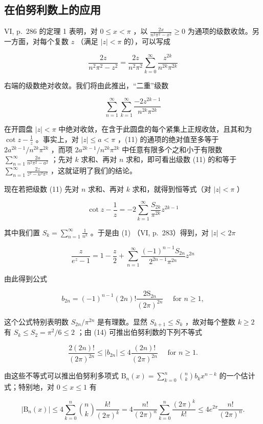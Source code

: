 \subsection{在伯努利数上的应用}

VI, p.~286 的定理 1 表明，对 \(0 \leqslant x < \pi\) ，以 \(\frac{2x}{n^2\pi^2 - x^2} \geqslant 0\) 为通项的级数收敛。另一方面，对每个复数 \(z\) （满足 \(|z| < \pi\) 的），可以写成

\[
{\frac {2 z}{n ^ {2} \pi^ {2} - z ^ {2}}} = {\frac {2 z}{n ^ {2} \pi^ {2}}} \sum_ {k = 0} ^ {\infty} {\frac {z ^ {2 k}}{n ^ {2 k} \pi^ {2 k}}}
\]

右端的级数绝对收敛。我们将由此推出，“二重”级数

\[
\sum_ {n = 1} ^ {\infty} \sum_ {k = 1} ^ {\infty} \frac {- 2 z ^ {2 k - 1}}{n ^ {2 k} \pi^ {2 k}}\tag{11}
\]

在开圆盘 \(|z| < \pi\) 中绝对收敛，在含于此圆盘的每个紧集上正规收敛，且其和为 \(\cot z - \frac{1}{z}\) 。事实上，对 \(|z| \leqslant a < \pi\) ，(11) 的通项的绝对值至多等于 \(2a^{2k-1}/n^{2k}\pi^{2k}\) ，而项 \(2a^{2k-1}/n^{2k}\pi^{2k}\) 中任意有限多个之和小于有限数 \(\sum_{n=1}^{\infty} \frac{2a}{n^2\pi^2 - a^2}\) ；先对 \(k\) 求和、再对 \(n\) 求和，即可看出级数 (11) 的和等于 \(\sum_{n=1}^{\infty} \frac{2z}{z^2 - n^2\pi^2}\) ，这就证明了我们的结论。

现在若把级数 (11) 先对 \(n\) 求和、再对 \(k\) 求和，就得到恒等式（对 \(|z| < \pi\) ）

\[
\cot z - \frac {1}{z} = - 2 \sum_ {k = 1} ^ {\infty} \frac {S _ {2 k}}{\pi^ {2 k}} z ^ {2 k - 1}\tag{12}
\]

其中我们置 \(S_{k} = \sum_{n=1}^{\infty} \frac{1}{n^{k}}\) 。于是由 (1) （VI, p.~283）得到，对 \(|z| < 2\pi\)

\[
\frac {z}{e ^ {z} - 1} = 1 - \frac {z}{2} + \sum_ {n = 1} ^ {\infty} \frac {(- 1) ^ {n - 1} S _ {2 n}}{2 ^ {2 n - 1} \pi^ {2 n}} z ^ {2 n}\tag{13}
\]

由此得到公式

\[
b _ {2 n} = (- 1) ^ {n - 1} (2 n)! \frac {2 \mathrm{S} _ {2 n}}{(2 \pi) ^ {2 n}} \quad \text {   for   } n \geqslant 1,\tag{14}
\]

这个公式特别表明数 \(S_{2n} / \pi^{2n}\) 是有理数。显然 \(S_{k + 1} \leqslant S_k\) ，故对每个整数 \(k \geqslant 2\) 有 \(S_k \leqslant S_2 = \pi^2 / 6 \leqslant 2\) ；由 (14) 可推出伯努利数的下列不等式

\[
\frac {2 (2 n) !}{(2 \pi) ^ {2 n}} \leqslant | b _ {2 n} | \leqslant 4 \frac {(2 n) !}{(2 \pi) ^ {2 n}} \quad \text {   for   } n \geqslant 1.\tag{15}
\]

由这些不等式可以推出伯努利多项式 \(\mathrm{B}_n(x) = \sum_{k=0}^{n}\binom{n}{k}b_kx^{n - k}\) 的一个估计式；特别地，对 \(0 \leqslant x \leqslant 1\) 有

\[
\left| \mathrm{B} _ {n} (x) \right| \leqslant 4 \sum_ {k = 0} ^ {n} \binom {n} {k} \frac {k !}{(2 \pi) ^ {k}} = 4 \frac {n !}{(2 \pi) ^ {n}} \sum_ {k = 0} ^ {n} \frac {(2 \pi) ^ {k}}{k !} \leqslant 4 e ^ {2 \pi} \frac {n !}{(2 \pi) ^ {n}}.\tag{16}
\]

